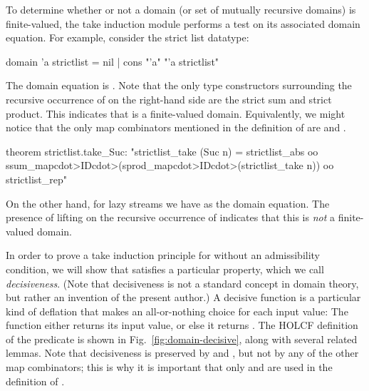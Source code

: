 To determine whether or not a domain (or set of mutually recursive domains) is finite-valued, the take induction module performs a test on its associated domain equation. For example, consider the strict list datatype:
%
\begin{isacode}
domain 'a strictlist = nil | cons "'a" "'a strictlist"
\end{isacode}
%
The domain equation is . Note that the only type constructors surrounding the recursive occurrence of  on the right-hand side are the strict sum and strict product. This indicates that  is a finite-valued domain. Equivalently, we might notice that the only map combinators mentioned in the definition of  are  and .
%
\begin{isacode}
theorem strictlist.take_Suc: "strictlist_take (Suc n) = strictlist_abs oo
  ssum_map\<cdot>ID\<cdot>(sprod_map\<cdot>ID\<cdot>(strictlist_take n)) oo strictlist_rep"
\end{isacode}
%
On the other hand, for lazy streams we have  as the domain equation. The presence of lifting on the recursive occurrence of  indicates that this is \emph{not} a finite-valued domain.

In order to prove a take induction principle for  without an admissibility condition, we will show that  satisfies a particular property, which we call \emph{decisiveness}. (Note that decisiveness is not a standard concept in domain theory, but rather an invention of the present author.) A decisive function is a particular kind of deflation that makes an all-or-nothing choice for each input value: The function either returns its input value, or else it returns . The HOLCF definition of the predicate  is shown in Fig.~\ref{fig:domain-decisive}, along with several related lemmas. Note that decisiveness is preserved by  and , but not by any of the other map combinators; this is why it is important that only  and  are used in the definition of . 

